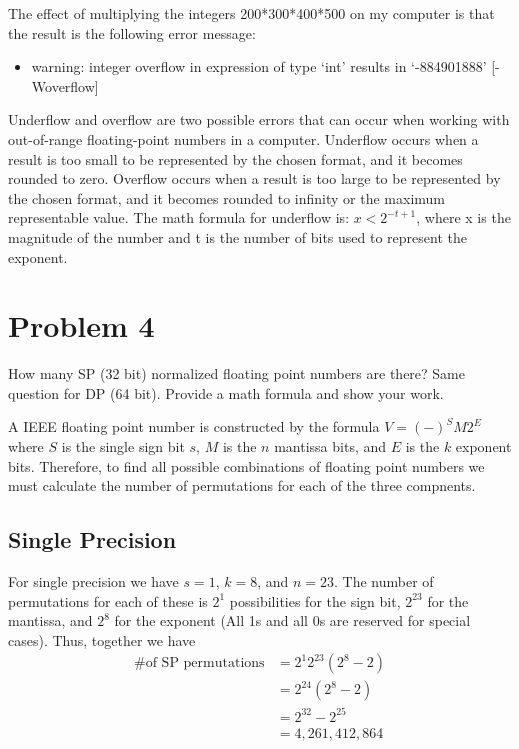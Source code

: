 \documentclass[12pt,letter]{article}
\begin{document}
The effect of multiplying the integers 200*300*400*500 on my computer is that the result is the following error message:
\begin{itemize}
    \item warning: integer overflow in expression of type ‘int’ results in ‘-884901888’ [-Woverflow]
\end{itemize}
Underflow and overflow are two possible errors that can occur when working with out-of-range floating-point numbers in a computer. Underflow occurs when a result is too small to be represented by the chosen format, and it becomes rounded to zero. Overflow occurs when a result is too large to be represented by the chosen format, and it becomes rounded to infinity or the maximum representable value.
The math formula for underflow is: $x < 2^{-t+1}$, where x is the magnitude of the number and t is the number of bits used to represent the exponent.

\section{Problem 4}
\begin{mdframed}
How many SP (32 bit) normalized floating point numbers are there? Same question for DP (64 bit).
Provide a math formula and show your work.
\end{mdframed}

A IEEE floating point number is constructed by the formula $V = (-)^S M 2^E$ where $S$ is the single
sign bit $s$, $M$ is the $n$ mantissa bits, and $E$ is the $k$ exponent bits. Therefore, to find all 
possible combinations of floating point numbers we must calculate the number of permutations for each
of the three compnents.

\subsection{Single Precision}
For single precision we have $s=1$, $k=8$, and $n=23$. The number of permutations for each of these is
$2^1$ possibilities for the sign bit, $2^{23}$ for the mantissa, and $2^8$ for the
exponent (All 1s and all 0s are reserved for special cases). Thus, together we have
\begin{align*}
    \text{\# of SP permutations} &= 2^1 2^{23} (2^8 - 2) \\
    &= 2^{24}(2^8 - 2) \\
    &= 2^{32} - 2^{25} \\
    &= 4,261,412,864
\end{align*}
\end{document}
